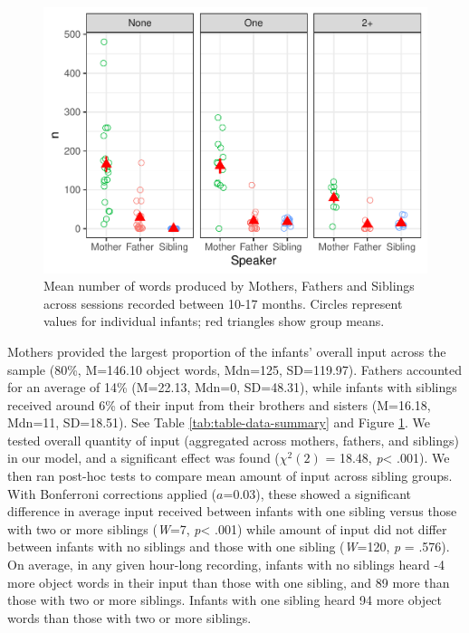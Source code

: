 \documentclass[
  english,
  man,floatsintext]{apa6}
\begin{document}
\begin{figure}
\centering
\includegraphics{SiblingsStudyText_files/figure-latex/Figure-Speaker-count-1.pdf}
\caption{\label{fig:Figure-Speaker-count}Mean number of words produced by Mothers, Fathers and Siblings across sessions recorded between 10-17 months. Circles represent values for individual infants; red triangles show group means.}
\end{figure}

Mothers provided the largest proportion of the infants' overall input across the sample (80\%, M=146.10 object words, Mdn=125, SD=119.97). Fathers accounted for an average of 14\% (M=22.13, Mdn=0, SD=48.31), while infants with siblings received around 6\% of their input from their brothers and sisters (M=16.18, Mdn=11, SD=18.51). See Table \ref{tab:table-data-summary} and Figure \ref{fig:Figure-Speaker-count}. We tested overall quantity of input (aggregated across mothers, fathers, and siblings) in our model, and a significant effect was found (\(\chi^2 (2)\) = 18.48, \emph{p}\textless{} .001). We then ran post-hoc tests to compare mean amount of input across sibling groups. With Bonferroni corrections applied (\(a\)=0.03), these showed a significant difference in average input received between infants with one sibling versus those with two
or more siblings (\emph{W}=7, \emph{p}\textless{} .001) while amount of input did not differ between infants with no siblings and those with one sibling (\emph{W}=120, \emph{p} = .576). On average, in any given hour-long recording, infants with no siblings heard -4 more object words in their input than those with one sibling, and 89 more than those with two or more siblings. Infants with one sibling heard 94 more object words than those with two or more siblings.
\end{document}
